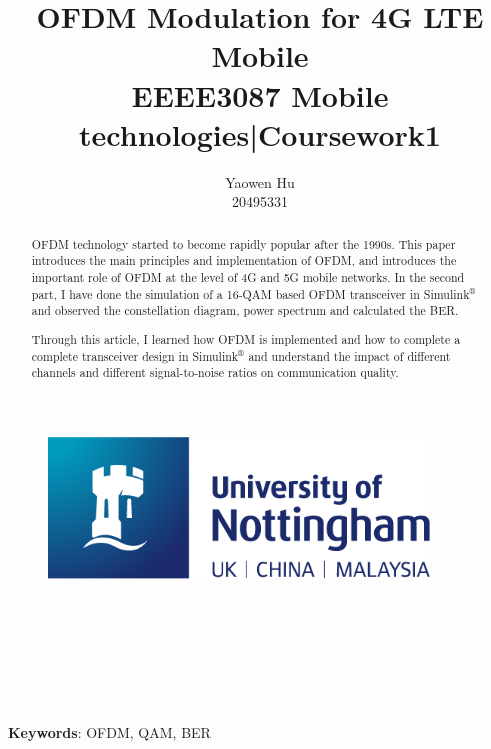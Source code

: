 \documentclass[11pt]{article}
\title{\vspace{20 pt}\huge{OFDM Modulation for 4G LTE Mobile}\\\vspace{10 pt}\large{EEEE3087 Mobile technologies|Coursework1}\vspace{100 pt}}
\author{\huge{Yaowen Hu}\\{\small 20495331}}
\date{}
\numberwithin{figure}{section}
\numberwithin{equation}{section}
\newcommand\keywords[1]{\textbf{Keywords}: #1}
\begin{document}
\begin{titlepage}
\begin{figure}
    \vspace{30 pt}
    \centering
    \includegraphics[width=0.9\textwidth]{images/logo.png}
\end{figure}

\vfill
\maketitle
\vspace{120 pt}
\\
\\
\\
\\
\vfill

\\
\vspace{10 pt}
\centering{\today}
\thispagestyle{empty}
\pagebreak
\end{titlepage}

\begin{abstract}
OFDM technology started to become rapidly popular after the 1990s. This paper introduces the main principles and implementation of OFDM, and introduces the important role of OFDM at the level of 4G and 5G mobile networks. In the second part, I have done the simulation of a 16-QAM based OFDM transceiver in Simulink$^\circledR$ and observed the constellation diagram, power spectrum and calculated the BER.

Through this article, I learned how OFDM is implemented and how to complete a complete transceiver design in Simulink$^\circledR$ and understand the impact of different channels and different signal-to-noise ratios on communication quality.
\end{abstract}
\keywords{OFDM, QAM, BER}
\setcounter{page}{1}
\thispagestyle{plain}
\pagebreak
\tableofcontents
\thispagestyle{empty}
\pagebreak
\end{document}
